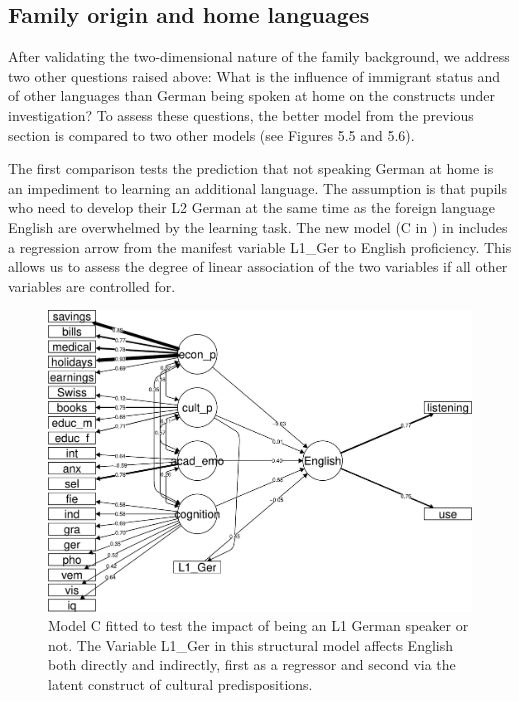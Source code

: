 \documentclass[output=paper]{langsci/langscibook}
\begin{document}
\subsection{Family origin and home languages}

After validating the two-dimensional nature of the family background, we address two other questions raised above: What is the influence of immigrant status and of other languages than German being spoken at home on the constructs under investigation? To assess these questions, the better model from the previous section is compared to two other models (see Figures 5.5 and 5.6).

The first comparison tests the prediction that not speaking German at home is an impediment to learning an additional language.  The assumption is that pupils who need to develop their L2 German at the same time as the foreign language English are overwhelmed by the learning task. The new model (C in ) in  includes a regression arrow from the manifest variable L1\_Ger to English proficiency. This allows us to assess the degree of linear association of the two variables if all other variables are controlled for.

\begin{figure}
\includegraphics[width=\textwidth]{figures/Figure5.5.pdf}
\caption{Model C fitted to test the impact of being an L1 German speaker or not. The Variable L1\_Ger in this structural model affects English both directly and indirectly, first as a regressor and second via the latent construct of cultural predispositions.\label{fig:05:5}}
\end{figure}
\end{document}
